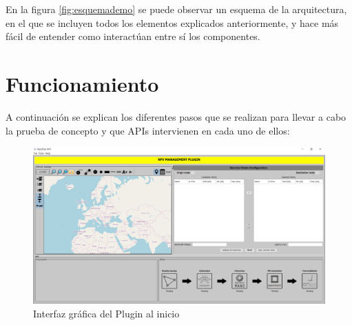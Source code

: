 En la figura \ref{fig:esquemademo} se puede observar un esquema de la arquitectura, en el que se incluyen todos los elementos explicados anteriormente, y hace más fácil de entender como interactúan entre sí los componentes.


\section{Funcionamiento}
\label{sec:funcprueba}

A continuación se explican los diferentes pasos que se realizan para llevar a cabo la prueba de concepto y que APIs intervienen en cada uno de ellos:

\begin{figure}[!ht]
	\centering
	\includegraphics[width=0.7\linewidth]{imagenes/nfvplugin_dashboard}
	\caption{Interfaz gráfica del Plugin al inicio}
	\label{fig:nfvproof_inicio}
\end{figure}

